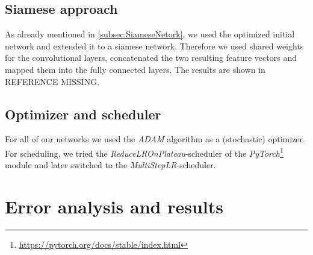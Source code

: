 \documentclass[conference]{IEEEtran}
\begin{document}
\subsection{Siamese approach}
As already mentioned in \cref{subsec:SiameseNetork}, we used the optimized initial network and extended
it to a siamese network. Therefore we used shared weights for the convolutional layers, concatenated 
the two resulting feature vectors and mapped them into the fully connected layers. The results are shown
in REFERENCE MISSING.

\subsection{Optimizer and scheduler}
For all of our networks we used the \emph{ADAM} \cite{Adam2014} algorithm as a (stochastic) optimizer. 
For scheduling, we tried the \emph{ReduceLROnPlateau}-scheduler of the \emph{PyTorch}\footnote{
\url{https://pytorch.org/docs/stable/index.html}} module and later
switched to the \emph{MultiStepLR}-scheduler.




\section{Error analysis and results}
\end{document}

